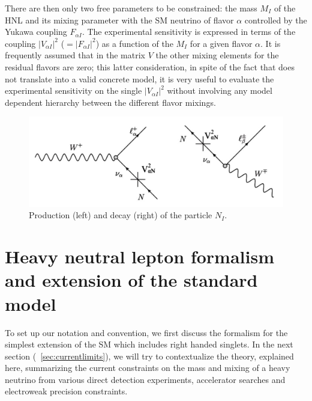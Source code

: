 There are then only two free parameters to be constrained: the mass $M_I$ of the HNL and its mixing parameter with the SM neutrino of flavor $\alpha$ controlled by the Yukawa coupling $F_{\alpha I}$. The experimental sensitivity is expressed in terms of the coupling $|V_{\alpha I}|^2$ ($= |F_{\alpha I}|^2$) as a function of the $M_I$ for a given flavor $\alpha$. It is frequently assumed that in the matrix $V$ the other mixing elements for the residual flavors are zero; this latter consideration, in spite of the fact that does not translate into a valid concrete model, it is very useful to evaluate the experimental sensitivity on the single $|V_{\alpha I}|^2$ without involving any model dependent hierarchy between the different flavor mixings. 
\begin{figure}[h]
  \centering
  \includegraphics[width=.80\textwidth]{Figures/c3/diagram_decay}
    \caption{Production (left) and decay (right) of the particle $N_{I}$.}
  \label{fig:c3diagram_decay}
\end{figure}

\section{Heavy neutral lepton formalism and extension of the standard model}
To set up our notation and convention, we first discuss the formalism for the simplest
extension of the SM which includes right handed singlets. In the next section (~\ref{sec:currentlimits}), we will try to contextualize the theory, explained here, summarizing the current constraints on the mass and mixing of a heavy neutrino from various direct
detection experiments, accelerator searches and electroweak precision constraints.
